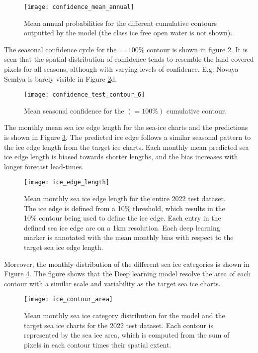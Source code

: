 \documentclass[../main/thesis.tex]{subfiles}
\begin{document}
\begin{figure}
    \centering
    \texttt{[image: confidence\_mean\_annual]}
    \caption{\label{fig:mean_annual_confidence}Mean annual probabilities for the different cumulative contours outputted by the model (the class ice free open water is not shown).}
\end{figure}

The seasonal confidence cycle for the $=100\%$ contour is shown in figure \ref{fig:confidence_seasonal}. It is seen that the spatial distribution of confidence tends to resemble the land-covered pixels for all seasons, although with varying levels of confidence. E.g. Novaya Semlya is barely visible in Figure \ref{fig:confidence_seasonal}d.

\begin{figure}
    \centering
    \texttt{[image: confidence\_test\_contour\_6]}
    \caption{\label{fig:confidence_seasonal}Mean seasonal confidence for the $(=100\%)$ cumulative contour.}
\end{figure}

The monthly mean sea ice edge length for the sea-ice charts and the predictions is shown in Figure \ref{fig:ice-edge-length}. The predicted ice edge follows a similar seasonal pattern to the ice edge length from the target ice charts. Each monthly mean predicted sea ice edge length is biased towards shorter lengths, and the bias increases with longer forecast lead-times.

\begin{figure}
    \centering
    \texttt{[image: ice\_edge\_length]}
    \caption{\label{fig:ice-edge-length}Mean monthly sea ice edge length for the entire 2022 test dataset. The ice edge is defined from a 10\% threshold, which results in the 10\% contour being used to define the ice edge. Each entry in the defined sea ice edge are on a 1km resolution. Each deep learning marker is annotated with the mean monthly bias with respect to the target sea ice edge length.}
\end{figure}

Moreover, the monthly distribution of the different sea ice categories is shown in Figure \ref{fig:ice-contour-area}. The figure shows that the Deep learning model resolve the area of each contour with a similar scale and variability as the target sea ice charts. 

\begin{figure}
    \centering
    \texttt{[image: ice\_contour\_area]}
    \caption{\label{fig:ice-contour-area}Mean monthly sea ice category distribution for the model and the target sea ice charts for the 2022 test dataset. Each contour is represented by the sea ice area, which is computed from the sum of pixels in each contour times their spatial extent.}
\end{figure}
\end{document}
